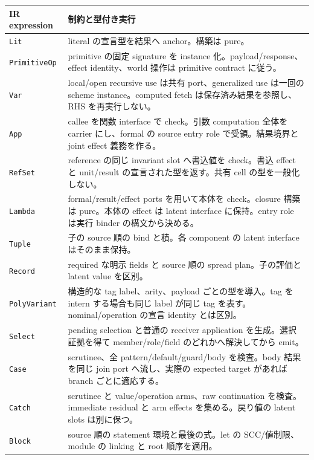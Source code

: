 \documentclass[11pt,a4paper]{article}
\theoremstyle{remark}
\begin{document}
\begin{longtable}{p{}p{}}
\toprule
IR expression & 制約と型付き実行 \\
\midrule\endhead
\texttt{Lit} & literal の宣言型を結果へ anchor。構築は pure。\\
\texttt{PrimitiveOp} & primitive の固定 signature を instance 化。payload/response、effect identity、world 操作は primitive contract に従う。\\
\texttt{Var} & local/open recursive use は共有 port、generalized use は一回の scheme instance。computed fetch は保存済み結果を参照し、RHS を再実行しない。\\
\texttt{App} & callee を関数 interface で check。引数 computation 全体を carrier にし、formal の source entry role で受領。結果境界と joint effect 義務を作る。\\
\texttt{RefSet} & reference の同じ invariant slot へ書込値を check。書込 effect と unit/result の宣言された型を返す。共有 cell の型を一般化しない。\\
\texttt{Lambda} & formal/result/effect ports を用いて本体を check。closure 構築は pure。本体の effect は latent interface に保持。entry role は実行 binder の構文から決める。\\
\texttt{Tuple} & 子の source 順の bind と積。各 component の latent interface はそのまま保持。\\
\texttt{Record} & required な明示 fields と source 順の spread plan。子の評価と latent value を区別。\\
\texttt{PolyVariant} & 構造的な tag label、arity、payload ごとの型を導入。tag を intern する場合も同じ label が同じ tag を表す。nominal/operation の宣言 identity とは区別。\\
\texttt{Select} & pending selection と普通の receiver application を生成。選択証拠を得て member/role/field のどれかへ解決してから emit。\\
\texttt{Case} & scrutinee、全 pattern/default/guard/body を検査。body 結果を同じ join port へ流し、実際の expected target があれば branch ごとに適応する。\\
\texttt{Catch} & scrutinee と value/operation arms、raw continuation を検査。immediate residual と arm effects を集める。戻り値の latent slots は別に保つ。\\
\texttt{Block} & source 順の statement 環境と最後の式。let の SCC/値制限、module の linking と root 順序を適用。\\
\bottomrule
\end{longtable}
\end{document}
